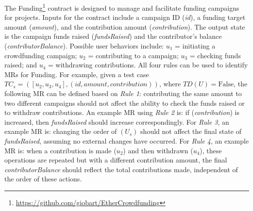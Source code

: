 The Funding\footnote{\url{https://github.com/giobart/EtherCrowdfunding}} contract is designed to manage and facilitate funding campaigns for projects. Inputs for the contract include a campaign ID (\textit{id}), a funding target amount (\textit{amount}), and the contribution amount (\textit{contribution}). The output state is the campaign funds raised (\textit{fundsRaised}) and the contributor's balance (\textit{contributorBalance}). Possible user behaviors include: \(u_1\) = initiating a crowdfunding campaign; \(u_2\) = contributing to a campaign; \(u_3\) = checking funds raised; and \(u_4\) = withdrawing contributions. All four rules can be used to identify MRs for Funding. For example, given a test case \(TC_s = ([u_2,u_3,u_4],(id, amount, contribution))\), where \(TD(U) = \text{False}\), the following MR can be defined based on \textit{Rule 1}: contributing the same amount to two different campaigns should not affect the ability to check the funds raised or to withdraw contributions. An example MR using \textit{Rule 2} is: if (\textit{contribution}) is increased, then \textit{fundsRaised} should increase correspondingly. For \textit{Rule 3}, an example MR is: changing the order of \((U_s)\) should not affect the final state of \textit{fundsRaised}, assuming no external changes have occurred. For \textit{Rule 4}, an example MR is: when a contribution is made (\(u_2\)) and then withdrawn (\(u_4\)), these operations are repeated but with a different contribution amount, the final \textit{contributorBalance} should reflect the total contributions made, independent of the order of these actions.

